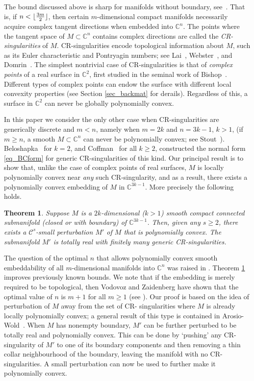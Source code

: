 \documentclass[10pt]{amsart}
\numberwithin{equation}{section}
\theoremstyle{definition}
\theoremstyle{definition}
\theoremstyle{plain}
\newtheorem{theorem}{Theorem}[section]
\DeclarePairedDelimiter\floor{\lfloor}{\rfloor}
\newcommand{\cont}{\mathcal{C}}
\newcommand{\Cn}{\mathbb{C}^n}
\newcommand{\C} {\mathbb{C}}
\begin{document}
The bound discussed above is sharp for manifolds without boundary, see~\cite{HoJaLa12}. That is, if $n<\floor{\frac{3m}{2}}$, then certain $m$-dimensional compact manifolds necessarily acquire complex tangent directions when embedded into $\Cn$. The  
points where the tangent space of $M\subset\Cn$ contains complex directions are called the {\it CR-singularities} of $M$. 
CR-singularities encode topological information about $M$, such as its 
Euler characteristic and Pontryagin numbers; see Lai~\cite{La72}, Webster~\cite{We85}, and Domrin~\cite{Do95}. The simplest nontrivial case of CR-singularities is that of {\it complex points} of a real surface in $\mathbb C^2$, first studied in the seminal work of Bishop~\cite{Bi65}. Different types of complex points can endow the surface with different local convexity properties (see Section \ref{sec_backmat} for derails). Regardless of this, a surface in $\mathbb C^2$ can never be globally polynomially convex.

In this paper we consider the only other case when CR-singularities are generically discrete and $m<n$, namely when $m=2k$ and 
$n=3k-1$, $k>1$, (if $m\geq  n$, a smooth $M\subset\Cn$ can never be polynomially convex; see Stout~\cite[Section~2.3]{St07}). 
Beloshapka~\cite{Be97} for $k=2$, and Coffman~\cite{Co97} for all $k\geq 2$, constructed the normal form \eqref{eq_BCform} for generic 
CR-singularities of this kind. Our principal result is to show
that, unlike the case of complex points of real surfaces, $M$ is locally polynomially convex near {\em any} such CR-singularity, 
and as a result, there exists a polynomially convex embedding of $M$ in $\C^{3k-1}$. More precisely the following holds.

\begin{theorem}\label{thm_main} 
Suppose $M$ is a $2k$-dimensional ($k>1$) smooth compact connected submanifold (closed or with boundary) 
of $\C^{3k-1}$. Then, given any $s\geq 2$, there exists a $\cont^s$-small perturbation $M'$ of $M$ that is polynomially convex. The submanifold 
$M'$ is totally real with finitely many generic CR-singularities.
\end{theorem}

The question of the optimal $n$ that allows polynomially convex smooth embeddability of all $m$-dimensional manifolds into $\Cn$ was raised in \cite[Question 4.]{IzSt18}. Theorem \ref{thm_main} improves previously known bounds. We note that if the embedding is merely required to be topological, then Vodovoz and Zaidenberg have shown that the optimal value of $n$ is $m+1$ for all $m\geq 1$ (see \cite{VoZa71}). Our proof is based on the idea of perturbation of $M$ away from the set of CR- singularities where $M$ is already locally polynomially 
convex; a general result of this type is contained in Arosio-Wold~\cite{ArWo17}.
When $M$ has nonempty boundary, $M'$ can be further perturbed to be totally real and polynomially 
convex. This can be done by `pushing' any CR-singularity of $M'$ to one of its boundary components and then removing a thin collar neighbourhood of the boundary, leaving the manifold with no CR-singularities. A small perturbation can now be used to further make it polynomially convex. 
\end{document}
